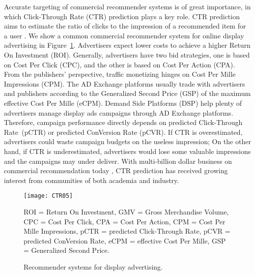 \documentclass[letterpaper]{article} \usepackage{aaai21}  \usepackage{times}  \usepackage{helvet} \usepackage{courier}  \usepackage[hyphens]{url}  \usepackage{graphicx} \urlstyle{rm} \def\UrlFont{\rm}  \usepackage{natbib}  \usepackage{caption} \frenchspacing  \setlength{\pdfpagewidth}{8.5in}  \setlength{\pdfpageheight}{11in}  \usepackage{graphicx}
\begin{document}
Accurate targeting of commercial recommender systems is of great importance, in which Click-Through Rate (CTR) prediction plays a key role. CTR prediction aims to estimate the ratio of clicks to the impression of a recommended item for a user . 
We show a common commercial recommender system for online display advertising in Figure~\ref{fig1}. Advertisers expect lower costs to achieve a higher Return On Investment (ROI). Generally, advertisers have two bid strategies, one is based on Cost Per Click (CPC), and the other is based on Cost Per Action (CPA). 
From the publishers’ perspective, traffic monetizing hinges on Cost Per  Mille Impressions (CPM). The AD Exchange platforms usually trade with advertisers and publishers according to the Generalized Second Price (GSP) of the maximum effective Cost Per Mille (eCPM). 
Demand Side Platforms (DSP) help plenty of advertisers manage display ads campaigns through AD Exchange platforms.
Therefore, campaign performance directly depends on predicted Click-Through Rate~(pCTR) or predicted ConVersion Rate (pCVR).
If CTR is overestimated, advertisers could waste campaign budgets on the useless impression; On the other hand, if CTR is underestimated, advertisers would lose some valuable impressions and the campaigns may under deliver. With multi-billion dollar business on commercial recommendation today , CTR prediction has received growing interest from communities of both academia and industry. 


\begin{figure}[t]
	\centering
	\texttt{[image: CTR05]} 

\tiny
{
	ROI = Return On Investment, GMV = Gross Merchandise Volume, CPC = Cost Per Click, CPA = Cost Per Action, CPM = Cost Per Mille Impressions, pCTR = predicted Click-Through Rate, pCVR = predicted ConVersion Rate, eCPM = effective Cost Per Mille, GSP = Generalized Second Price.
}
\vspace{-0.2cm}
	\caption{Recommender systems for display advertising.}
	\vspace{-0.55cm}
	\label{fig1}
\end{figure}
\end{document}
